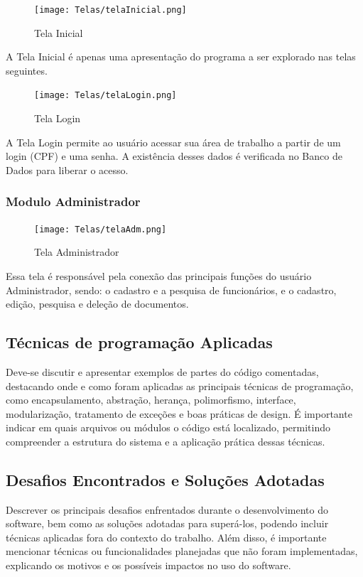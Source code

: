 \documentclass{article}
\begin{document}
\begin{figure}[H]
    \centering
    \texttt{[image: Telas/telaInicial.png]}
    \caption{Tela Inicial}
\end{figure}

A Tela Inicial é apenas uma apresentação do programa a ser explorado nas telas seguintes.

\begin{figure}[H]
    \centering
    \texttt{[image: Telas/telaLogin.png]}
    \caption{Tela Login}
\end{figure}

A Tela Login permite ao usuário acessar sua área de trabalho a partir de um login (CPF) e uma senha. A existência desses dados é verificada no Banco de Dados para liberar o acesso. 

\subsubsection{Modulo Administrador}

\begin{figure}[H]
    \centering
    \texttt{[image: Telas/telaAdm.png]}
    \caption{Tela Administrador}
\end{figure}

Essa tela é responsável pela conexão das principais funções do usuário Administrador, sendo: o cadastro e a pesquisa de funcionários, e o cadastro, edição, pesquisa e deleção de documentos.

\subsection{Técnicas de programação Aplicadas}

Deve-se discutir e apresentar exemplos de partes do código comentadas, destacando onde e como foram aplicadas as principais técnicas de programação, como encapsulamento, abstração, herança, polimorfismo, interface, modularização, tratamento de exceções e boas práticas de design. É importante indicar em quais arquivos ou módulos o código está localizado, permitindo compreender a estrutura do sistema e a aplicação prática dessas técnicas.

\subsection{Desafios Encontrados e Soluções Adotadas}

Descrever os principais desafios enfrentados durante o desenvolvimento do software, bem como as soluções adotadas para superá-los, podendo incluir técnicas aplicadas fora do contexto do trabalho. Além disso, é importante mencionar técnicas ou funcionalidades planejadas que não foram implementadas, explicando os motivos e os possíveis impactos no uso do software.
\end{document}
